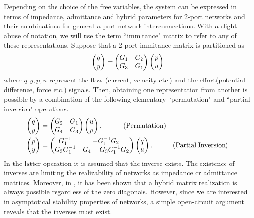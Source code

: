 Depending on the choice of the free variables, the system can be expressed in terms of impedance, admittance 
and hybrid parameters for 2-port networks and their combinations for general $n$-port network interconnections. 
With a slight abuse of notation, we will use the term ``immitance" matrix to refer to any of these representations. 
Suppose that a 2-port immitance matrix is partitioned as
\[
\begin{pmatrix}q\\y\end{pmatrix}=\begin{pmatrix}G_1 &G_2\\G_3 &G_4\end{pmatrix}\begin{pmatrix}p\\u\end{pmatrix}
\]
where $q,y,p,u$ represent the flow (current, velocity etc.) and the effort(potential difference, force etc.) signals. Then, 
obtaining one representation from another is possible by a combination of the following elementary ``permutation" and 
``{partial} inversion" operations:
\begin{align*}
\pmatr{q\\y}&=\pmatr{G_2 &G_1\\G_4 &G_3}\pmatr{u\\p}, \ \ \ \tag{Permutation}\\
\pmatr{p\\y}&=\pmatr{\inv{G_1} &-\inv{G_1}G_2\\G_3\inv{G_1} &G_4-G_3\inv{G_1}G_2}\pmatr{q\\u}. \ \ \ \tag{Partial Inversion}
\end{align*}
In the latter operation it is assumed that the inverse exists. The existence of inverses are limiting the realizability
of networks as impedance or admittance matrices. Moreover, in \cite{andersonHmat}, it has been shown that a hybrid matrix
realization is always possible regardless of the zero diagonals. However, since we are interested in asymptotical stability
properties of networks, a simple open-circuit argument reveals that the inverses must exist.
